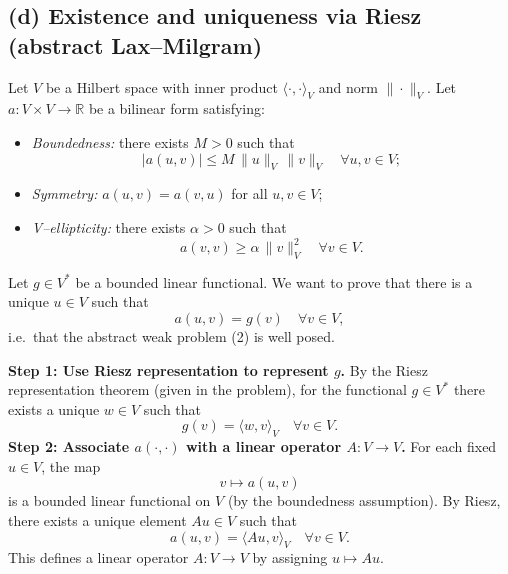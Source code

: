 \subsection*{(d) Existence and uniqueness via Riesz (abstract Lax--Milgram)}
Let $V$ be a Hilbert space with inner product $\langle\cdot,\cdot\rangle_V$ and norm
$\|\cdot\|_V$.
Let $a:V\times V\to\mathbb{R}$ be a bilinear form satisfying:
\begin{itemize}
  \item \emph{Boundedness:}
        there exists $M>0$ such that
        \[
          |a(u,v)| \le M\,\|u\|_V\,\|v\|_V
          \quad\forall u,v\in V;
        \]
  \item \emph{Symmetry:}
        $a(u,v) = a(v,u)$ for all $u,v\in V$;
  \item \emph{V--ellipticity:}
        there exists $\alpha>0$ such that
        \[
          a(v,v) \ge \alpha\,\|v\|_V^2
          \quad\forall v\in V.
        \]
\end{itemize}
Let $g\in V^\ast$ be a bounded linear functional.
We want to prove that there is a unique $u\in V$ such that
\[
  a(u,v) = g(v)\quad\forall v\in V,
\]
i.e.\ that the abstract weak problem (2) is well posed.

\textbf{Step 1: Use Riesz representation to represent $g$.}
By the Riesz representation theorem (given in the problem), for the functional
$g\in V^\ast$ there exists a unique $w\in V$ such that
\[
  g(v) = \langle w,v\rangle_V \quad\forall v\in V.
\]
\textbf{Step 2: Associate $a(\cdot,\cdot)$ with a linear operator $A:V\to V$.}
For each fixed $u\in V$, the map
\[
  v \mapsto a(u,v)
\]
is a bounded linear functional on $V$ (by the boundedness assumption).
By Riesz, there exists a unique element $Au \in V$ such that
\[
  a(u,v) = \langle Au,v\rangle_V \quad\forall v\in V.
\]
This defines a linear operator $A:V\to V$ by assigning $u\mapsto Au$.


